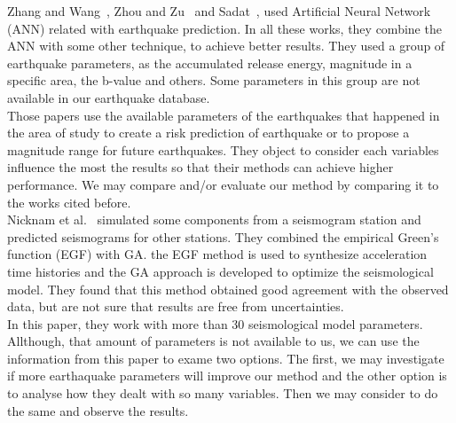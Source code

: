 
Zhang and Wang~\cite{Zhang2012}, Zhou and Zu~\cite{Feiyan2014} and Sadat~\cite{sadat2015application}, used Artificial Neural Network (ANN) related with earthquake prediction. In all these works, they combine the ANN with some other technique, to achieve better results. They used a group of earthquake parameters, as the accumulated release energy, magnitude in a specific area, the b-value and others. Some parameters in this group are not available in our earthquake database.\\

Those papers use the available parameters of the earthquakes that happened in the area of study to create a risk prediction of earthquake or to propose a magnitude range for future earthquakes. They object to consider each variables influence the most the results so that their methods can achieve higher performance. We may compare and/or evaluate our method by comparing it to the works cited before.\\

Nicknam et al.~\cite{Nicknam2010} simulated some components from a seismogram station and predicted seismograms for other stations. They combined the empirical Green’s function (EGF) with GA. the EGF method is used to synthesize acceleration time histories and the GA approach is developed to optimize the seismological model. They found that this method obtained good agreement with the observed data, but are not sure that results are free from uncertainties.\\

In this paper, they work with more than 30 seismological model parameters. Allthough, that amount of parameters is not available to us, we can use the information from this paper to exame two options. The first, we may investigate if more earthaquake parameters will improve our method and the other option is to analyse how they dealt with so many variables. Then we may consider to do the same and observe the results.\\  

